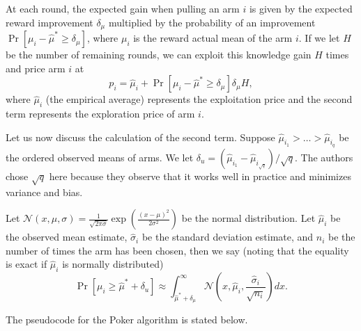 \documentclass[12pt]{article}
\begin{document}
At each round, the expected gain when pulling an arm $i$ is given by the expected reward improvement $\delta_{\mu}$ multiplied by the probability of an
improvement $\Pr[\mu_i - \hat{\mu}^{*} \ge \delta_{\mu}]$, where $\mu_i$ is the reward actual mean of the arm $i$.  If we let $H$ be the number of remaining rounds, 
we can exploit this knowledge gain $H$ times and price arm $i$ at
$$
p_i = \hat{\mu}_i + \Pr[\mu_i - \hat{\mu}^{*} \ge \delta_{\mu}] \delta_{\mu} H,
$$
where $\hat{\mu}_i$ (the empirical average) represents the exploitation price and the second term represents the exploration price of arm $i$. 

Let us now discuss the calculation of the second term.  Suppose $\hat{\mu}_{i_1} > \ldots > \hat{\mu}_{i_q}$ be the ordered observed means of arms.  
We let $\delta_u = \left(\hat{\mu}_{i_1} - \hat{\mu}_{i_{\sqrt{q}}} \right)/\sqrt{q}$.  The authors chose $\sqrt{q}$ here because they observe that it works well
in practice and minimizes variance and bias.

Let $\mathcal{N}(x, \mu, \sigma) = \frac{1}{\sqrt{2 \pi \sigma}} \exp \left(\frac{(x - \mu)^2}{2 \sigma^2} \right)$ be the normal distribution.  
Let $\hat{\mu}_i$ be the observed mean estimate, $\hat{\sigma}_i$ be the standard deviation estimate, and $n_i$ be the number of times the arm has been chosen, then
we say (noting that the equality is exact if $\hat{\mu}_{i}$ is normally distributed)
$$
\Pr[\mu_i \ge \hat{\mu}^{*} + \delta_u] \approx \int_{\hat{\mu}^{*} + \delta_{\mu}}^{\infty} \mathcal{N}\left(x, \hat{\mu}_{i}, \frac{\hat{\sigma}_i}{\sqrt{n_i}} \right) dx.
$$

The pseudocode for the Poker algorithm is stated below.
\end{document}
